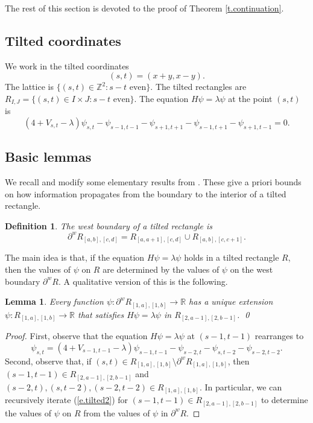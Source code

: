 \documentclass{amsart}
\newtheorem{lemma}[equation]{Lemma}
\newtheorem{definition}[equation]{Definition}
\newcommand{\eref}[1]{(\ref{e.#1})}
\newcommand{\tref}[1]{Theorem \ref{t.#1}}
\numberwithin{equation}{section}
\numberwithin{figure}{section}
\newcommand{\Z}{\mathbb{Z}}
\newcommand{\R}{\mathbb{R}}
\begin{document}
The rest of this section is devoted to the proof of \tref{continuation}.

\subsection{Tilted coordinates}

We work in the tilted coordinates
\begin{equation*}
(s,t) = (x+y,x-y).
\end{equation*}
The lattice is $\{ (s,t) \in \Z^2 : s-t \mbox{ even} \}$.  The tilted rectangles are $R_{I,J} = \{ (s,t) \in I \times J : s - t \mbox{ even} \}.$  The equation $H \psi = \lambda \psi$ at the point $(s,t)$ is
\begin{equation}
\label{e.tilted1}
(4 + V_{s,t} - \lambda) \psi_{s,t} - \psi_{s-1,t-1} - \psi_{s+1,t+1} - \psi_{s-1,t+1} - \psi_{s+1,t-1} = 0.
\end{equation}

\subsection{Basic lemmas}

We recall and modify some elementary results from \cite{Buhovsky-Logunov-Malinnikova-Sodin}.  These give a priori bounds on how information propagates from the boundary to the interior of a tilted rectangle.  

\begin{definition}
  The west boundary of a tilted rectangle is
  \begin{equation*}
  \partial^w R_{[a,b],[c,d]} = R_{[a,a+1],[c,d]} \cup R_{[a,b],[c,c+1]}.
  \end{equation*}
\end{definition}

The main idea is that, if the equation $H \psi = \lambda \psi$ holds in a tilted rectangle $R$, then the values of $\psi$ on $R$ are determined by the values of $\psi$ on the west boundary $\partial^w R$.  A qualitative version of this is the following.

\begin{lemma}
\label{l.extension}
Every function $\psi : \partial^w R_{[1,a],[1,b]} \to \R$ has a unique extension $\psi : R_{[1,a],[1,b]} \to \R$ that satisfies $H \psi = \lambda \psi$ in $R_{[2,a-1],[2,b-1]}$. \qed
\end{lemma}

\begin{proof}
First, observe that the equation $H \psi = \lambda \psi$ at $(s-1,t-1)$ rearranges to
\begin{equation}
\label{e.tilted2}
\psi_{s,t} = (4 + V_{s-1,t-1} - \lambda) \psi_{s-1,t-1} - \psi_{s-2,t} - \psi_{s,t-2} - \psi_{s-2,t-2}.
\end{equation}
Second, observe that, if $(s,t) \in R_{[1,a],[1,b]} \setminus \partial^w R_{[1,a],[1,b]}$, then $(s-1,t-1) \in R_{[2,a-1],[2,b-1]}$ and $(s-2,t), (s,t-2), (s-2,t-2) \in R_{[1,a],[1,b]}$.  In particular, we can recursively iterate \eref{tilted2} for $(s-1,t-1) \in R_{[2,a-1],[2,b-1]}$ to determine the values of $\psi$ on $R$ from the values of $\psi$ in $\partial^w R$.  
\end{proof}
\end{document}
